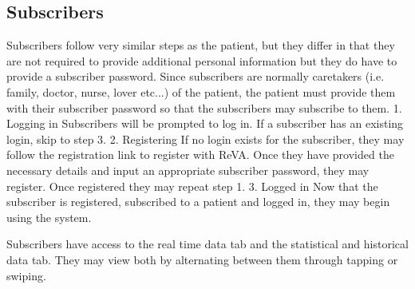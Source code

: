 \subsection{Subscribers} %
Subscribers follow very similar steps as the patient, but they differ in that they are not required to provide additional personal information but they do have to provide a subscriber password. Since subscribers are normally caretakers (i.e. family, doctor, nurse, lover etc...) of the patient, the patient must provide them with their subscriber password so that the subscribers may subscribe to them. 
	1. Logging in
		Subscribers will be prompted to log in. If a subscriber has an existing login, skip to step 3. 
	2. Registering 
		If no login exists for the subscriber, they may follow the registration link to register with ReVA. Once they have 			provided the necessary details and input an appropriate subscriber password, they may register. Once registered they may 		 repeat step 1. 
	3. Logged in
		Now that the subscriber is registered, subscribed to a patient and logged in, they may begin using the system. 
		
	Subscribers have access to the real time data tab and the statistical and historical data tab. They may view both by alternating between them through tapping or swiping. 

